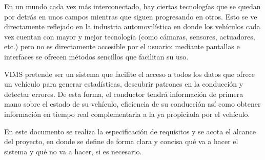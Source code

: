 En un mundo cada vez más interconectado, hay ciertas tecnologías que se quedan
por detrás en unos campos mientras que siguen progresando en otros. Esto se ve
directamente reflejado en la industria automovilística en donde los vehículos
cada vez cuentan con mayor y mejor tecnología (como cámaras, sensores, actuadores,
etc.) pero no es directamente accesible por el usuario: mediante pantallas e
interfaces se ofrecen métodos sencillos que facilitan su uso.

\ac{VIMS} pretende ser un sistema que facilite el acceso a todos los datos que
ofrece un vehículo para generar estadísticas, descubrir patrones en la conducción
y detectar errores. De esta forma, el conductor tendrá información de primera
mano sobre el estado de su vehículo, eficiencia de su conducción así como obtener
información en tiempo real complementaria a la ya propiciada por el vehículo.

En este documento se realiza la especificación de requisitos y se acota el
alcance del proyecto, en donde se define de forma clara y concisa qué va a hacer
el sistema y qué no va a hacer, si es necesario.